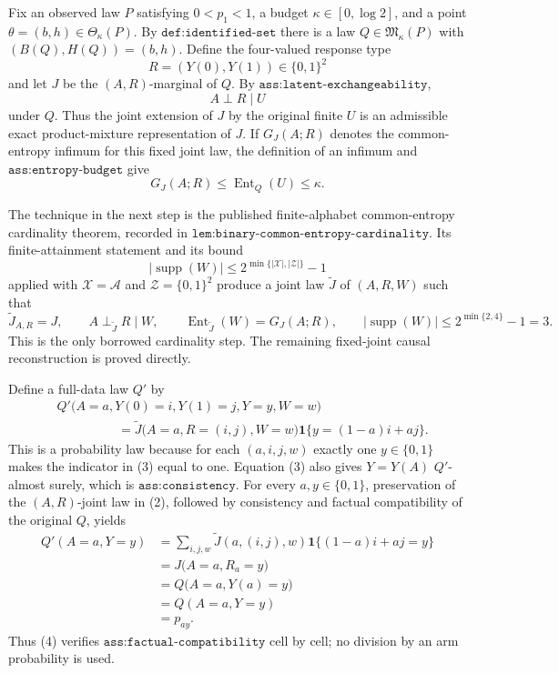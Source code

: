 Fix an observed law \(P\) satisfying \(0<p_1<1\), a budget \(\kappa\in[0,\log 2]\), and a point \(\theta=(b,h)\in\Theta_\kappa(P)\).  By \(\texttt{def:identified-set}\) there is a law \(Q\in\mathfrak M_\kappa(P)\) with \((B(Q),H(Q))=(b,h)\).  Define the four-valued response type
\[
R=(Y(0),Y(1))\in\{0,1\}^2
\]
and let \(J\) be the \((A,R)\)-marginal of \(Q\).  By \(\texttt{ass:latent-exchangeability}\),
\[
A\perp R\mid U
\]
under \(Q\).  Thus the joint extension of \(J\) by the original finite \(U\) is an admissible exact product-mixture representation of \(J\).  If \(G_J(A;R)\) denotes the common-entropy infimum for this fixed joint law, the definition of an infimum and \(\texttt{ass:entropy-budget}\) give
\[
G_J(A;R)\leq \operatorname{Ent}_Q(U)\leq\kappa. \tag{1}
\]

The technique in the next step is the published finite-alphabet common-entropy cardinality theorem, recorded in \(\texttt{lem:binary-common-entropy-cardinality}\).  Its finite-attainment statement and its bound
\[
|\operatorname{supp}(W)|
\leq 2^{\min\{|\mathcal X|,|\mathcal Z|\}}-1
\]
applied with \(\mathcal X=\mathcal A\) and \(\mathcal Z=\{0,1\}^2\) produce a joint law \(\widetilde J\) of \((A,R,W)\) such that
\[
\widetilde J_{A,R}=J,
\qquad A\perp_{\widetilde J}R\mid W,
\qquad \operatorname{Ent}_{\widetilde J}(W)=G_J(A;R),
\qquad |\operatorname{supp}(W)|\leq 2^{\min\{2,4\}}-1=3. \tag{2}
\]
This is the only borrowed cardinality step.  The remaining fixed-joint causal reconstruction is proved directly.

Define a full-data law \(Q'\) by
\[
\begin{split}
&Q'\bigl(A=a,Y(0)=i,Y(1)=j,Y=y,W=w\bigr)\\
&\hspace{2cm}=
\widetilde J\bigl(A=a,R=(i,j),W=w\bigr)
\mathbf 1\{y=(1-a)i+aj\}.
\end{split} \tag{3}
\]
This is a probability law because for each \((a,i,j,w)\) exactly one \(y\in\{0,1\}\) makes the indicator in (3) equal to one.  Equation (3) also gives \(Y=Y(A)\) \(Q'\)-almost surely, which is \(\texttt{ass:consistency}\).  For every \(a,y\in\{0,1\}\), preservation of the \((A,R)\)-joint law in (2), followed by consistency and factual compatibility of the original \(Q\), yields
\[
\begin{split}
Q'(A=a,Y=y)
&=\sum_{i,j,w}\widetilde J(a,(i,j),w)
  \mathbf 1\{(1-a)i+aj=y\}\\
&=J\bigl(A=a,R_a=y\bigr)\\
&=Q\bigl(A=a,Y(a)=y\bigr)\\
&=Q(A=a,Y=y)\\
&=p_{ay}.
\end{split} \tag{4}
\]
Thus (4) verifies \(\texttt{ass:factual-compatibility}\) cell by cell; no division by an arm probability is used.

